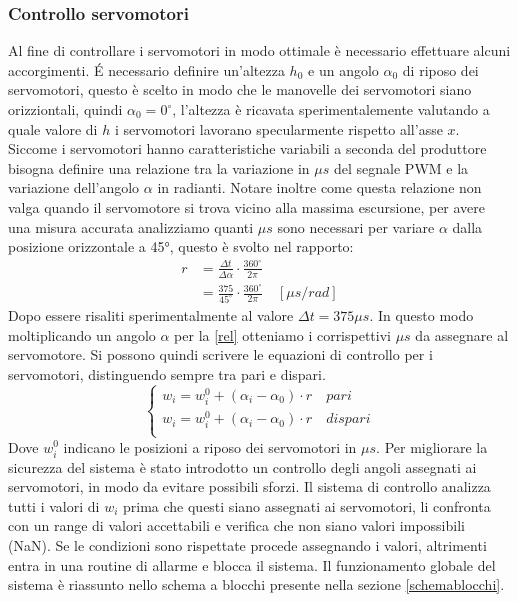 \documentclass[11pt]{article}
\begin{document}
\subsubsection{Controllo servomotori}
Al fine di controllare i servomotori in modo ottimale è necessario effettuare alcuni accorgimenti.
É necessario definire un'altezza $h_0$ e un angolo $\alpha_0$ di riposo dei servomotori, questo è scelto in modo che le manovelle dei servomotori siano orizziontali, quindi $\alpha_0=0^\circ$, l'altezza è ricavata sperimentalemente valutando a quale valore di $h$ i servomotori lavorano specularmente rispetto all'asse $x$.
Siccome i servomotori hanno caratteristiche variabili a seconda del produttore bisogna definire una relazione tra la variazione in $\mu s$ del segnale PWM e la variazione dell'angolo $\alpha$ in radianti. Notare inoltre come questa relazione non valga quando il servomotore si trova vicino alla massima escursione, per avere una misura accurata analizziamo quanti $\mu s$ sono necessari per variare $\alpha$ dalla posizione orizzontale a 45°, questo è svolto nel rapporto:
\begin{align}\label{rel}
r &=\frac{\Delta t}{\Delta\alpha}\cdot \frac{360^\circ}{2 \pi}\\
	&= \frac{375}{45^\circ}\cdot \frac{360^\circ}{2 \pi} \quad [\mu s/rad]
\end{align}
Dopo essere risaliti sperimentalmente al valore $\Delta t = 375 \mu s$. In questo modo moltiplicando un angolo $\alpha$ per la \eqref{rel} otteniamo i corrispettivi $\mu s$ da assegnare al servomotore. Si possono quindi scrivere le equazioni di controllo per i servomotori, distinguendo sempre tra pari e dispari.
\begin{equation}\label{w}
    \begin{cases}
      w_i=w_i^0 +(\alpha_i-\alpha_0)\cdot r	\quad pari \\
      w_i=w_i^0 +(\alpha_i-\alpha_0)\cdot r	\quad dispari \\
    \end{cases}
\end{equation}
Dove $w_i^0$ indicano le posizioni a riposo dei servomotori in $\mu s$.
Per migliorare la sicurezza del sistema è stato introdotto un controllo degli angoli assegnati ai servomotori, in modo da evitare possibili sforzi.
Il sistema di controllo analizza tutti i valori di $w_i$ prima che questi siano assegnati ai servomotori, li confronta con un range di valori accettabili e verifica che non siano valori impossibili (NaN).
Se le condizioni sono rispettate procede assegnando i valori, altrimenti entra in una routine di allarme e blocca il sistema. Il funzionamento globale del sistema è riassunto nello schema a blocchi presente nella sezione \ref{schemablocchi}.
\end{document}

